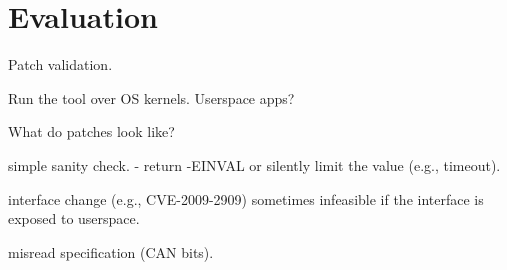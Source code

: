 \section{Evaluation}
\label{s:eval}

Patch validation.

Run the tool over OS kernels.  Userspace apps?

What do patches look like?

simple sanity check.
- return -EINVAL or silently limit the value (e.g., timeout).

interface change (e.g., CVE-2009-2909)
sometimes infeasible if the interface is exposed to userspace.

misread specification (CAN bits).
